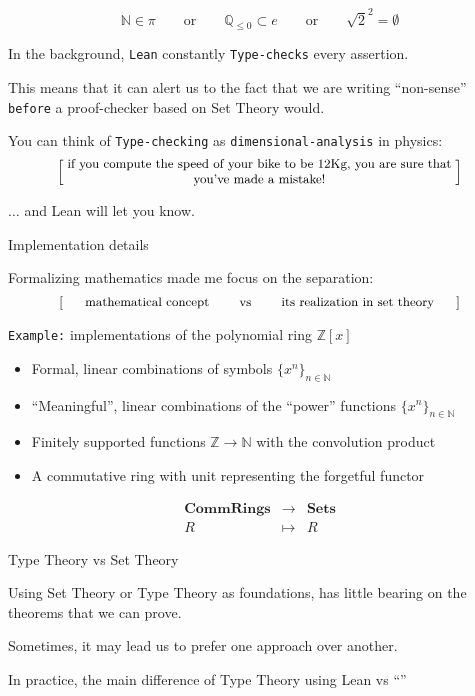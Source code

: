 \documentclass{beamer}
\begin{document}
\begin{frame}[fragile]

$$
  \mathbb{N} \in \pi
  \qquad {\textrm{or}} \qquad
  \mathbb{Q}_{\le 0} \subset e
  \qquad {\textrm{or}} \qquad
  \sqrt{2} ^ 2 = \emptyset
$$

In the background, {\color{violet}\verb`Lean`} constantly {\color{violet}\verb`Type-checks`} every assertion.

This means that it can alert us to the fact that we are writing ``non-sense'' {\color{violet}\verb`before`} a proof-checker based on Set Theory would.

You can think of {\color{violet}\verb`Type-checking`} as {\color{violet}\verb`dimensional-analysis`} in physics:
\[
  \left[ \;
  \parbox{0.8\textwidth}{\centering\small
  if you compute the speed of your bike to be $12$Kg, you are sure that you've made a mistake!
  }
  \; \right]
\]

$\ldots$ and Lean will let you know.
\end{frame}

\begin{frame}[fragile]{Implementation details}

Formalizing mathematics made me focus on the separation:
\[
  \left[ \;
  \parbox{0.8\textwidth}{\centering\small
  mathematical concept  \qquad vs \qquad its realization in set theory
  }
  \; \right]
\]

{\color{violet}\verb`Example:`} implementations of the polynomial ring $\mathbb{Z}[x]$
\\

\vspace{-13pt}
\begin{itemize}
\setlength\itemsep{-12pt}
\item
  Formal, linear combinations of symbols $\{ x^n \}_{n \in \mathbb{N}}$
\item
  ``Meaningful'', linear combinations of the ``power'' functions $\{ x^n \}_{n \in \mathbb{N}}$
\item
  Finitely supported functions $\mathbb{Z} \to \mathbb{N}$ with the convolution product
\item
  A commutative ring with unit representing the forgetful functor
\end{itemize}
$$
  \begin{array}{rcl}
    {\textbf{CommRings}} & \longrightarrow & {\textbf{Sets}} \\
    R & \longmapsto & R
  \end{array}
$$
\end{frame}

\begin{frame}[fragile]{Type Theory vs Set Theory}

Using Set Theory or Type Theory as foundations, has little bearing on the theorems that we can prove.

Sometimes, it may lead us to prefer one approach over another.

In practice, the main difference of Type Theory using Lean vs ``''
\end{frame}

\begin{frame}[fragile]
\end{frame}
\end{document}

